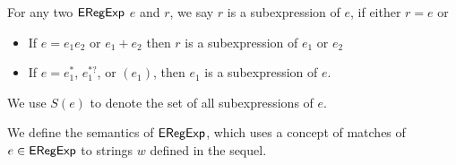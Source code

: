   \begin{definition}[Subexpression]
  	For any two ${\sf ERegExp}$ $e$ and $r$, we say $r$ is a subexpression of $e$,
  	if either $r=e$ or
  	\begin{itemize}
  		\item If $e = e_1 e_2$ or $e_1 + e_2$ then $r$ is a subexpression of $e_1$
  		or $e_2$
  		
  		\item If $e = e_1^{\ast}$, $e_1^{\ast?}$, or $(e_1)$, then $e_1$ is a subexpression of $e$.
  	\end{itemize}
  	We use $S (e)$ to denote the set of all subexpressions of $e$.
  \end{definition}

We  define the semantics of ${\sf ERegExp}$, which uses a concept of matches of $e \in {\sf ERegExp}$ to strings $w$ defined in the sequel.
  
